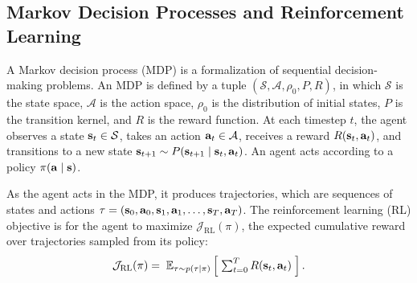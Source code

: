 \subsection{Markov Decision Processes and Reinforcement Learning}
\label{sec:mdp_background}
A Markov decision process (MDP) is a formalization of sequential decision-making problems.
An MDP is defined by a tuple $(\mathcal{S}, \mathcal{A}, \rho_0, P, R)$, in which $\mathcal{S}$ is the state space, $\mathcal{A}$ is the action space, $\rho_0$ is the distribution of initial states, $P$ is the transition kernel, and $R$ is the reward function.
At each timestep $t$, the agent observes a state $\mathbf{s}_t \in \mathcal{S}$, takes an action $\mathbf{a}_t \in \mathcal{A}$, receives a reward $R(\mathbf{s}_t, \mathbf{a}_t)$, and transitions to a new state $\mathbf{s}_{t+1} \sim P(\mathbf{s}_{t+1} \mid \mathbf{s}_t, \mathbf{a}_t)$. An agent acts according to a policy $\pi(\mathbf{a} \mid \mathbf{s})$.

As the agent acts in the MDP, it produces trajectories, which are sequences of states and actions $\tau = (\mathbf{s}_0, \mathbf{a}_0, \mathbf{s}_1, \mathbf{a}_1, \dots, \mathbf{s}_{T}, \mathbf{a}_{T})$.
The reinforcement learning (RL) objective is for the agent to maximize $\mathcal{J}_{\text{RL}}(\pi)$, the expected cumulative reward over trajectories sampled from its policy:
\begin{equation*}
    \textstyle
    \mathcal{J}_\text{RL}(\pi) = \; \mathbb{E}_{
        \tau \sim p(\tau \mid \pi)
    } \left[ 
        \; \sum_{t=0}^{T} R(\mathbf{s}_t, \mathbf{a}_t) \;
     \right].
\end{equation*}
